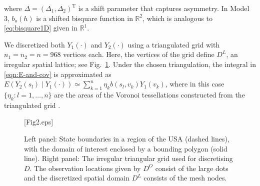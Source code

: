 \documentclass[lineno]{biometrika}
\def\T{{ \mathrm{\scriptscriptstyle T} }}
\newcommand{\Deltab} {\Delta}
\newcommand{\svec} {s}
\newcommand{\h}{h}
\renewcommand{\v}{v}
\newcommand{\Yvec}{Y}
\newcommand{\E}{E}
\let\originalleft\left
\let\originalright\right
\renewcommand{\left}{\mathopen{}\mathclose\bgroup\originalleft}
\renewcommand{\right}{\aftergroup\egroup\originalright}
\begin{document}
\noindent where $\Deltab = (\Delta_1, \Delta_2)^\T$ is a shift parameter that captures asymmetry. In Model 3, $b_o(\h)$ is a shifted bisquare function in $\mathbb{R}^2$, which is analogous to \eqref{eq:bisquare1D} given in $\mathbb{R}^1$.

We discretized both $Y_1(\cdot)$ and $Y_2(\cdot)$ using a triangulated grid with $n_1= n_2 = n = 968$ vertices each. Here, the vertices of the grid define $D^L$, an irregular spatial lattice; see Fig.~\ref{fig:mesh}.
Under the chosen triangulation, the integral in \eqref{eqn:E-and-cov} is approximated as $\E(Y_2(\svec_l) \mid  Y_1(\cdot)) \simeq \sum_{k=1}^{n} \eta_k b(\svec_l,\v_k)Y_1(\v_k)$, where in this case $\{\eta_k: l = 1,\dots,n\}$ are the areas of the Voronoi tessellations constructed from the triangulated grid \citep[e.g.,][]{Lee_1980}.

 \begin{figure}[!t]
\figurebox{10pc}{}{}[Fig2.eps]
 	\caption{Left panel: State boundaries in a region of the USA (dashed lines), with the domain of interest enclosed by a bounding polygon (solid line). Right panel: The irregular triangular grid used for discretising $D$. The observation locations given by $D^O$ consist of the large dots and the discretized spatial domain $D^L$ consists of the mesh nodes.} \label{fig:mesh}
 \end{figure}
\end{document}
